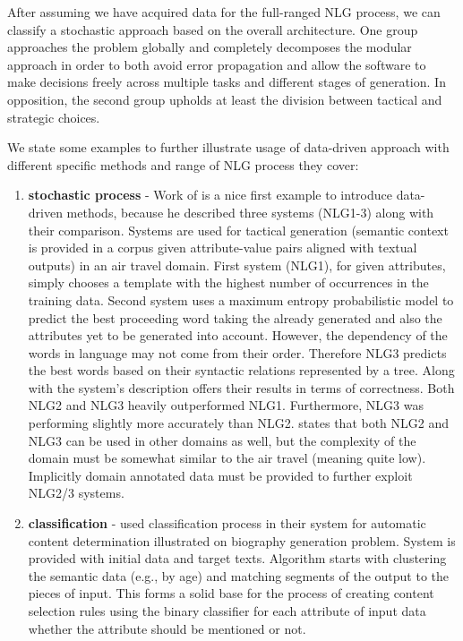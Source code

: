 After assuming we have acquired data for the full-ranged NLG process, we can classify a stochastic approach based on the overall architecture. One group approaches the problem globally and completely decomposes the modular approach in order to both avoid error propagation and allow the software to make decisions freely across multiple tasks and different stages of generation. In opposition, the second group upholds at least the division between tactical and strategic choices.  

We state some examples to further illustrate usage of data-driven approach with different specific methods and range of NLG process they cover:
\begin{enumerate}
	\item \textbf{stochastic process} - Work of \cite{ratnaparkhi2000trainable} is a nice first example to introduce data-driven methods, because he described three systems (NLG1-3) along with their comparison. Systems are used for tactical generation (semantic context is provided in a corpus given attribute-value pairs aligned with textual outputs) in an air travel domain. First system (NLG1), for given attributes, simply chooses a template with the highest number of occurrences in the training data. Second system uses a maximum entropy probabilistic model to predict the best proceeding  word taking the already generated and also the attributes yet to be generated into account. However, the dependency of the words in language may not come from their order. Therefore NLG3 predicts the best words based on their syntactic relations represented by a tree. Along with the system's description \cite{ratnaparkhi2000trainable} offers their results in terms of correctness. Both NLG2 and NLG3 heavily outperformed NLG1. Furthermore, NLG3 was performing slightly more accurately than NLG2.  \cite{ratnaparkhi2000trainable} states that both NLG2 and NLG3 can be used in other domains as well, but the complexity of the domain must be somewhat similar to the air travel (meaning quite low). Implicitly domain annotated data must be provided to further exploit NLG2/3 systems.\label{dd-1}
	\item \textbf{classification} - \cite{duboue2003statistical} used classification process in their system for automatic content determination illustrated on biography generation problem. System is provided with initial data and target texts. Algorithm starts with clustering the semantic data (e.g., by age) and matching segments of the output to the pieces of input. This forms a solid base for the process of creating content selection rules using the binary classifier for each attribute of input data whether the attribute should be mentioned or not.\label{dd-2}

\end{enumerate}
